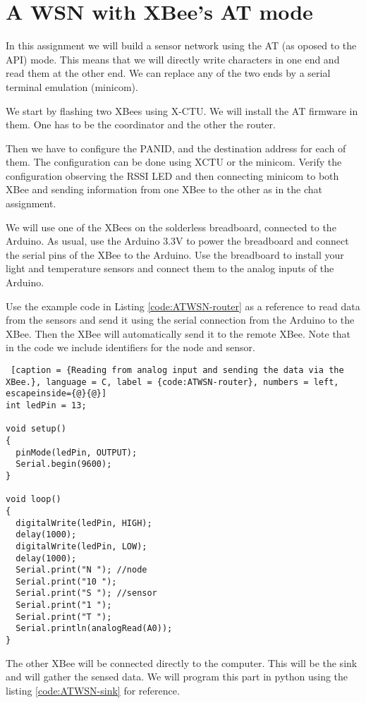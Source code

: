 \chapter{A WSN with XBee's AT mode}

In this assignment we will build a sensor network using the AT (as oposed to the API) mode.
This means that we will directly write characters in one end and read them at the other end.
We can replace any of the two ends by a serial terminal emulation (minicom).

We start by flashing two XBees using X-CTU.
We will install the AT firmware in them.
One has to be the coordinator and the other the router.

Then we have to configure the PANID, and the destination address for each of them.
The configuration can be done using XCTU or the minicom.
Verify the configuration observing the RSSI LED and then connecting minicom to both XBee and sending information from one XBee to the other as in the chat assignment.

We will use one of the XBees on the solderless breadboard, connected to the Arduino.
As usual, use the Arduino 3.3V to power the breadboard and connect the serial pins of the XBee to the Arduino.
Use the breadboard to install your light and temperature sensors and connect them to the analog inputs of the Arduino.

Use the example code in Listing \ref{code:ATWSN-router} as a reference to read data from the sensors and send it using the serial connection from the Arduino to the XBee. 
Then the XBee will automatically send it to the remote XBee.
Note that in the code we include identifiers for the node and sensor.

\begin{lstlisting} [caption = {Reading from analog input and sending the data via the XBee.}, language = C, label = {code:ATWSN-router}, numbers = left, escapeinside={@}{@}]
int ledPin = 13;

void setup()
{
  pinMode(ledPin, OUTPUT);
  Serial.begin(9600);
}

void loop()
{
  digitalWrite(ledPin, HIGH);
  delay(1000);
  digitalWrite(ledPin, LOW);
  delay(1000);
  Serial.print("N "); //node
  Serial.print("10 ");
  Serial.print("S "); //sensor
  Serial.print("1 ");
  Serial.print("T ");
  Serial.println(analogRead(A0));
}
\end{lstlisting}


The other XBee will be connected directly to the computer.
This will be the sink and will gather the sensed data.
We will program this part in python using the listing \ref{code:ATWSN-sink} for reference.



